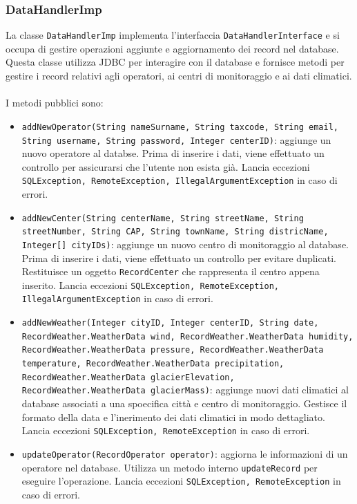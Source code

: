 \subsubsection{DataHandlerImp}
La classe \texttt{DataHandlerImp} implementa l'interfaccia \texttt{DataHandlerInterface} e si occupa di gestire operazioni aggiunte e aggiornamento dei record nel database.
Questa classe utilizza JDBC per interagire con il database e fornisce metodi per gestire i record relativi agli operatori, ai centri di monitoraggio e ai dati climatici.\\
\\
I metodi pubblici sono:
\begin{itemize}
    \item \texttt{addNewOperator(String nameSurname, String taxcode, String email, String username, String password, Integer centerID)}:
          aggiunge un nuovo operatore al databse. Prima di inserire i dati, viene effettuato un controllo per assicurarsi che l'utente non esista già.
          Lancia eccezioni \texttt{SQLException, RemoteException, IllegalArgumentException} in caso di errori.
    \item \texttt{addNewCenter(String centerName, String streetName, String streetNumber, String CAP, String townName, String districName, Integer[] cityIDs)}:
          aggiunge un nuovo centro di monitoraggio al database. Prima di inserire i dati, viene effettuato un controllo per evitare duplicati. Restituisce un oggetto \texttt{RecordCenter} che rappresenta il centro appena inserito.
          Lancia eccezioni \texttt{SQLException, RemoteException, IllegalArgumentException} in caso di errori.
    \item \texttt{addNewWeather(Integer cityID, Integer centerID, String date, RecordWeather.WeatherData wind, RecordWeather.WeatherData humidity, RecordWeather.WeatherData pressure, RecordWeather.WeatherData temperature, RecordWeather.WeatherData precipitation, RecordWeather.WeatherData glacierElevation, RecordWeather.WeatherData glacierMass)}:
          aggiunge nuovi dati climatici al database associati a una spoecifica città e centro di monitoraggio. Gestisce il formato della data e l'inerimento dei dati climatici in modo dettagliato.
          Lancia eccezioni \texttt{SQLException, RemoteException} in caso di errori.
    \item \texttt{updateOperator(RecordOperator operator)}:
          aggiorna le informazioni di un operatore nel database. Utilizza un metodo interno \texttt{updateRecord} per eseguire l'operazione.
          Lancia eccezioni \texttt{SQLException, RemoteException} in caso di errori.
\end{itemize}
